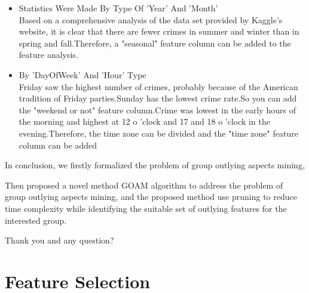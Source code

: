 \documentclass[
 size=14pt,
 paper=smartboard,  %
 mode=present, 		%
 display=slides, 	%
 style=tuliplab,  	%
 pauseslide,
 fleqn,leqno]{powerdot}
\begin{document}



\begin{slide}[toc=,bm=]{}
\begin{itemize}
\item Statistics Were Made By Type Of 'Year' And 'Month'
\\Based on a comprehensive analysis of the data set provided by Kaggle's website,
it is clear that there are fewer crimes in summer and winter than in spring 
and fall.Therefore, a "seasonal" feature column can be added to the feature analysis.
\item 
By 'DayOfWeek' And 'Hour' Type
\\Friday saw the highest number of crimes, probably because of the American tradition 
of Friday parties.Sunday has the lowest crime rate.So you can add the "weekend or not" feature
column.Crime was lowest in the early hours of the morning and highest at 12 o 'clock and 17 and
18 o 'clock in the evening.Therefore, the time zone can be divided and the "time zone" feature 
column can be added
\end{itemize}

\begin{note}
In conclusion,
we firstly formalized the problem of
group outlying aspects mining,

Then proposed a novel method GOAM algorithm to address the problem of
group outlying aspects mining,
and the proposed method use pruning to reduce time complexity
while identifying the suitable set of outlying features for the interested group.

Thank you and any question?
\end{note}

\end{slide}



\section{Feature Selection} 
\end{document}
